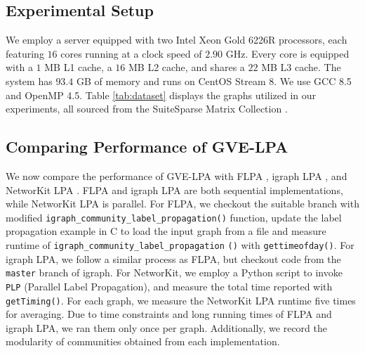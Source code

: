 \subsection{Experimental Setup}
\label{sec:setup}

We employ a server equipped with two Intel Xeon Gold 6226R processors, each featuring $16$ cores running at a clock speed of $2.90$ GHz. Every core is equipped with a $1$ MB L1 cache, a $16$ MB L2 cache, and shares a $22$ MB L3 cache. The system has $93.4$ GB of memory and runs on CentOS Stream 8. We use GCC 8.5 and OpenMP 4.5. Table \ref{tab:dataset} displays the graphs utilized in our experiments, all sourced from the SuiteSparse Matrix Collection \cite{suite19}.








\subsection{Comparing Performance of GVE-LPA}

We now compare the performance of GVE-LPA with FLPA \cite{traag2023large}, igraph LPA \cite{csardi2006igraph}, and NetworKit LPA \cite{staudt2016networkit}. FLPA and igraph LPA are both sequential implementations, while NetworKit LPA is parallel. For FLPA, we checkout the suitable branch with modified \texttt{igraph\_community\_label\_propagation()} function, update the label propagation example in C to load the input graph from a file and measure runtime of \texttt{igraph\_community\_label\_propagation} \texttt{()} with \texttt{gettimeofday()}. For igraph LPA, we follow a similar process as FLPA, but checkout code from the \texttt{master} branch of igraph. For NetworKit, we employ a Python script to invoke \texttt{PLP} (Parallel Label Propagation), and measure the total time reported with \texttt{getTiming()}. For each graph, we measure the NetworKit LPA runtime five times for averaging. Due to time constraints and long running times of FLPA and igraph LPA, we ran them only once per graph. Additionally, we record the modularity of communities obtained from each implementation.


